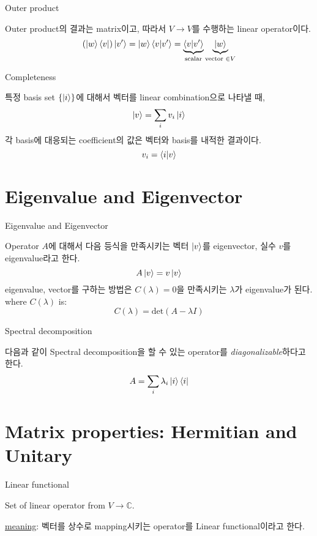 \documentclass[9pt]{beamer}
\begin{document}
    \begin{frame}{Outer product}
        \begin{definition}
            Outer product의 결과는 matrix이고, 따라서 $V \rightarrow V$를 수행하는 linear operator이다.
            $$(\ket w \bra v) \ket{v'} = \ket w \braket{v|v'} = \underbrace{\braket{v|v'}}_{\text{scalar}} \underbrace{\ket w}_{\text{vector } \in V}$$
        \end{definition}
    \end{frame}

    \begin{frame}{Completeness}
        \begin{theorem}
            특정 basis set $\{\ket i \}$에 대해서 벡터를 linear combination으로 나타낼 때,
            $$\ket v = \sum_{i} v_i \ket{i} $$
            각 basis에 대응되는 coefficient의 값은 벡터와 basis를 내적한 결과이다.
            $$v_i  = \braket{i | v}$$
        \end{theorem}
    \end{frame}

    \section{Eigenvalue and Eigenvector}
    \begin{frame}{Eigenvalue and Eigenvector}
        \begin{definition}
            Operator $A$에 대해서 다음 등식을 만족시키는 벡터 $\ket v$를 eigenvector, 실수 $v$를 eigenvalue라고 한다. 
            $$A \ket v = v \ket v$$
            eigenvalue, vector를 구하는 방법은 $C(\lambda) = 0$을 만족시키는 $\lambda$가 eigenvalue가 된다. 
            where $C(\lambda)$ is:
            $$C(\lambda) = \text{det}(A - \lambda I)$$
        \end{definition}
    \end{frame}

    \begin{frame}{Spectral decomposition}
        \begin{definition}
            다음과 같이 Spectral decomposition을 할 수 있는 operator를 \textit{diagonalizable}하다고 한다.
            $$A = \sum_i \lambda_i \ket i \bra i$$
        \end{definition}
    \end{frame}

    \section{Matrix properties: Hermitian and Unitary}
    \begin{frame}{Linear functional}
        \begin{definition}
            Set of linear operator from $V \rightarrow \mathbb C$.
        \end{definition}
        \checkmark \underline{meaning}: 벡터를 상수로 mapping시키는 operator를 Linear functional이라고 한다. 
    \end{frame}
\end{document}
